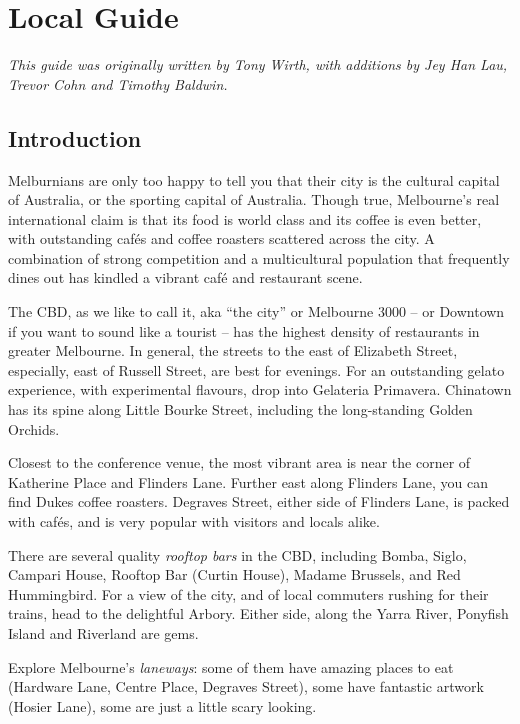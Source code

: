 \chapter{Local Guide}
\thispagestyle{emptyheader}

\emph{This guide was originally written by Tony Wirth, with additions by 
  Jey Han Lau, Trevor Cohn and Timothy Baldwin.}

\section*{Introduction}

Melburnians are only too happy to tell you that their city is the cultural
capital of Australia, or the sporting capital of Australia.
Though true, Melbourne's real international claim is that its food is 
world class and its coffee is even better, with outstanding
caf\'{e}s and coffee roasters scattered across the city.
A combination of strong competition and a multicultural
population that frequently dines out
has kindled a vibrant caf{\'e} and restaurant scene.

The CBD, as we like to call it, aka ``the city'' or Melbourne 3000 -- or
Downtown if you want to sound like a tourist -- has the highest density
of restaurants in greater Melbourne. In general, the streets to the east
of Elizabeth Street, especially, east of Russell Street, are best for
evenings.  For an outstanding gelato experience, with experimental
flavours, drop into Gelateria Primavera. Chinatown has its spine along
Little Bourke Street, including the long-standing Golden Orchids.

Closest to the conference venue,
the most vibrant area
is near the corner of
Katherine Place and Flinders Lane.
Further east along Flinders Lane,
you can find Dukes coffee roasters.
Degraves Street, either side of Flinders Lane, is packed with caf{\'e}s,
and is very popular with visitors and locals alike.

There are several quality \emph{rooftop bars} in the CBD,
including Bomba, Siglo, Campari
House, Rooftop Bar (Curtin House), Madame Brussels, and Red Hummingbird.
For a view of the city, and of local commuters rushing for
their trains, head to the delightful Arbory. Either side, along the 
Yarra River, Ponyfish Island and Riverland are gems.

Explore Melbourne's {\em laneways}: some of them have amazing places to 
eat (Hardware Lane, Centre Place, Degraves Street), some have fantastic artwork (Hosier Lane), some are just a little scary looking.

